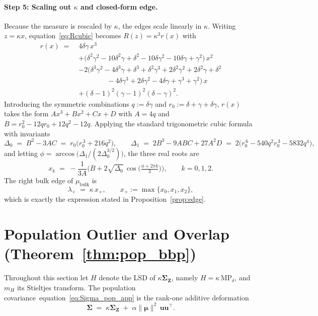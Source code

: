 \documentclass{article}
\def\eqref#1{equation~\ref{#1}}
\def\vmu{{\bm{\mu}}}
\def\vu{{\bm{u}}}
\def\mZ{{\bm{Z}}}
\def\mSigma{{\bm{\Sigma}}}
\begin{document}
\paragraph{Step 5: Scaling out $\kappa$ and closed-form edge.}
Because the measure is rescaled by $\kappa$, the edges scale linearly in $\kappa$. Writing $z=\kappa x$, \eqref{eq:Rcubic} becomes $R(z)=\kappa^3 r(x)$ with
\begin{align*}
    r(x) \;=\;& 4\delta\gamma\, x^3 \\
    &+ \Big(\delta^2\gamma^2 - 10\delta^2\gamma + \delta^2 - 10\delta\gamma^2 - 10\delta\gamma + \gamma^2\Big)\, x^2 \\
    &- 2\Big(\delta^3\gamma^2 - 4\delta^3\gamma + \delta^3 + \delta^2\gamma^3 + 2\delta^2\gamma^2 + 2\delta^2\gamma + \delta^2 \\
    &\qquad\qquad - 4\delta\gamma^3 + 2\delta\gamma^2 - 4\delta\gamma + \gamma^3 + \gamma^2\Big)\, x \\
    &+ (\delta-1)^2(\gamma-1)^2(\delta-\gamma)^2.
\end{align*}
Introducing the symmetric combinations $q:=\delta\gamma$ and $r_0:=\delta+\gamma+\delta\gamma$, $r(x)$ takes the form $Ax^3+Bx^2+Cx+D$ with $A=4q$ and $B=r_0^2-12 q r_0+12 q^2-12 q$. Applying the standard trigonometric cubic formula with invariants
\[
    \Delta_0 \;=\; B^2-3AC \;=\; r_0\big(r_0^{\,3}+216 q^2\big),
    \qquad
    \Delta_1 \;=\; 2B^3-9ABC+27A^2 D \;=\; 2\big(r_0^{\,6}-540 q^2 r_0^{\,3}-5832 q^4\big),
\]
and letting $\phi=\arccos\!\big(\Delta_1/(2\Delta_0^{3/2})\big)$, the three real roots are
\[
    x_k \;=\; -\frac{1}{3A}\bigg(B + 2\sqrt{\Delta_0}\,\cos\!\Big(\tfrac{\phi+2\pi k}{3}\Big)\bigg),\qquad k=0,1,2.
\]
The right bulk edge of $\mu_{\mathrm{bulk}}$ is
\[
    \lambda_+ \;=\; \kappa\,x_+, \qquad x_+ := \max\{x_0,x_1,x_2\},
\]
which is exactly the expression stated in Proposition~\ref{prop:edge}.


\section{Population Outlier and Overlap (Theorem~\ref{thm:pop_bbp})}\label{app:pop}

Throughout this section let $H$ denote the LSD of $\kappa\mSigma_\mZ$, namely $H=\kappa\,\mathrm{MP}_\delta$, and $m_H$ its Stieltjes transform. The population covariance~\eqref{eq:Sigma_pop_app} is the rank-one additive deformation
\[
    \mSigma \;=\; \kappa\mSigma_\mZ \;+\; \alpha\|\vmu\|^2\,\vu\vu^\top.
\]
\end{document}
